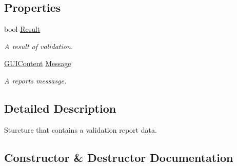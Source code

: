 \subsection*{Properties}
\begin{DoxyCompactItemize}
\item 
bool \mbox{\hyperlink{struct_wpf_handler_1_1_u_i_1_1_auto_layout_1_1_form_descriptor_1_1_validation_report_a0f4de7224f6cc1999e761bda1618c90c}{Result}}
\begin{DoxyCompactList}\small\item\em A result of validation. \end{DoxyCompactList}\item 
\mbox{\hyperlink{class_wpf_handler_1_1_u_i_1_1_g_u_i_content}{G\+U\+I\+Content}} \mbox{\hyperlink{struct_wpf_handler_1_1_u_i_1_1_auto_layout_1_1_form_descriptor_1_1_validation_report_a6471563ada41b77fb47c8dc38c263d7c}{Message}}
\begin{DoxyCompactList}\small\item\em A report\textquotesingle{}s messasge. \end{DoxyCompactList}\end{DoxyCompactItemize}


\subsection{Detailed Description}
Sturcture that contains a validation report data. 



\subsection{Constructor \& Destructor Documentation}
\mbox{\label{struct_wpf_handler_1_1_u_i_1_1_auto_layout_1_1_form_descriptor_1_1_validation_report_a1275fe61d36101439b465c802ec9aa7e}} 
